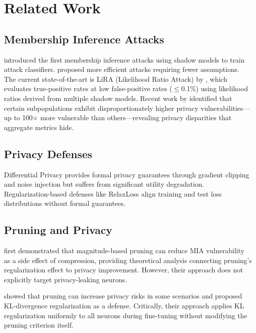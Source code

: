 \documentclass[11pt]{article}
\begin{document}
\section{Related Work}

\subsection{Membership Inference Attacks}

\citet{shokri2017membership} introduced the first membership inference attacks using shadow models to train attack classifiers. \citet{salem2019mlleaks} proposed more efficient attacks requiring fewer assumptions. The current state-of-the-art is LiRA (Likelihood Ratio Attack) by \citet{carlini2022membership}, which evaluates true-positive rates at low false-positive rates ($\leq$0.1\%) using likelihood ratios derived from multiple shadow models. Recent work by \citet{zhang2024spurious} identified that certain subpopulations exhibit disproportionately higher privacy vulnerabilities---up to 100$\times$ more vulnerable than others---revealing privacy disparities that aggregate metrics hide.

\subsection{Privacy Defenses}

Differential Privacy \citep{abadi2016deep} provides formal privacy guarantees through gradient clipping and noise injection but suffers from significant utility degradation. Regularization-based defenses like RelaxLoss \citep{chen2022relaxloss} align training and test loss distributions without formal guarantees.

\subsection{Pruning and Privacy}

\citet{wang2021against} first demonstrated that magnitude-based pruning can reduce MIA vulnerability as a side effect of compression, providing theoretical analysis connecting pruning's regularization effect to privacy improvement. However, their approach does not explicitly target privacy-leaking neurons.

\citet{yuan2022membership} showed that pruning can increase privacy risks in some scenarios and proposed KL-divergence regularization as a defense. Critically, their approach applies KL regularization uniformly to all neurons during fine-tuning without modifying the pruning criterion itself.
\end{document}
